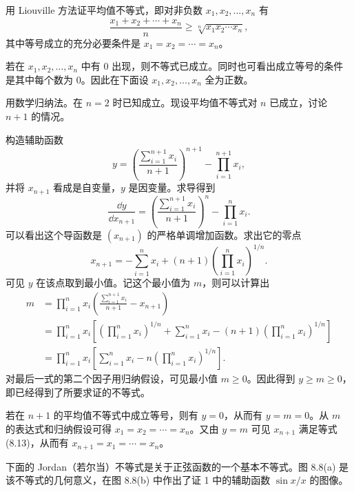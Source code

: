 \begin{xexample}[8.5.5]
用 Liouville 方法证平均值不等式，即对非负数 $x_1,x_2,\ldots,x_n$ 有
\[
  \frac{x_1+x_2+\cdots+x_n}{n}\ge\sqrt[n]{x_1x_2\cdots x_n},
\]
其中等号成立的充分必要条件是 $x_1=x_2=\cdots=x_n$。
\end{xexample}
\begin{xproof}
若在 $x_1,x_2,\ldots,x_n$ 中有 0 出现，则不等式已成立。同时也可看出成立等号的条件是其中每个数为 0。因此在下面设 $x_1,x_2,\ldots,x_n$ 全为正数。

用数学归纳法。在 $n=2$ 时已知成立。现设平均值不等式对 $n$ 已成立，讨论 $n+1$ 的情况。

构造辅助函数
\[
  y=\left(\frac{\sum_{i=1}^{n+1}x_i}{n+1}\right)^{n+1}
  -\prod_{i=1}^{n+1}x_i,
\]
并将 $x_{n+1}$ 看成是自变量，$y$ 是因变量。求导得到
\[
  \frac{\dd y}{\dd x_{n+1}}
  =\left(\frac{\sum_{i=1}^{n+1}x_i}{n+1}\right)^n
  -\prod_{i=1}^n x_i.
\]
可以看出这个导函数是 $(x_{n+1})$ 的严格单调增加函数。求出它的零点
\begin{equation}
  x_{n+1}=-\sum_{i=1}^n x_i+(n+1)\left(\prod_{i=1}^n x_i\right)^{1/n}.
  \tag{8.13}
  \label{eq:8.13}
\end{equation}
可见 $y$ 在该点取到最小值。记这个最小值为 $m$，则可以计算出
\begin{align*}
  m
  &=\prod_{i=1}^n x_i\left(\frac{\sum_{i=1}^{n+1}x_i}{n+1}-x_{n+1}\right)\\
  &=\prod_{i=1}^n x_i\left[
    \left(\prod_{i=1}^n x_i\right)^{1/n}
    +\sum_{i=1}^n x_i
    -(n+1)\left(\prod_{i=1}^n x_i\right)^{1/n}
  \right]\\
  &=\prod_{i=1}^n x_i\left[
    \sum_{i=1}^n x_i-n\left(\prod_{i=1}^n x_i\right)^{1/n}
  \right].
\end{align*}
对最后一式的第二个因子用归纳假设，可见最小值 $m\ge0$。因此得到 $y\ge m\ge0$，即已经得到了所要求证的不等式。

若在 $n+1$ 的平均值不等式中成立等号，则有 $y=0$，从而有 $y=m=0$。从 $m$ 的表达式和归纳假设可得 $x_1=x_2=\cdots=x_n$。又由 $y=m$ 可见 $x_{n+1}$ 满足等式 (8.13)，从而有 $x_{n+1}=x_1=\cdots=x_n$。
\end{xproof}

下面的 Jordan（若尔当）不等式是关于正弦函数的一个基本不等式。图 8.8(a) 是该不等式的几何意义，在图 8.8(b) 中作出了证 1 中的辅助函数 $\sin x/x$ 的图像。

